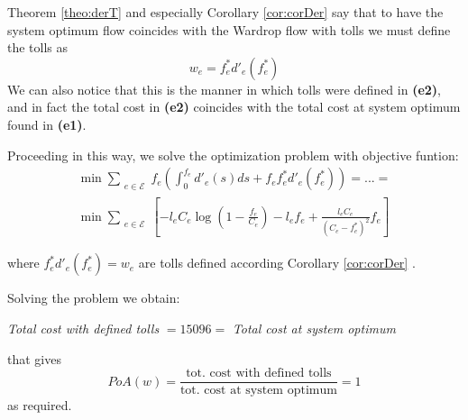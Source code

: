 \documentclass[
	12pt, %
]{fphw}
\begin{document}
\begin{enumerate}[{\bfseries (a)}]
    
    Theorem \ref{theo:derT} and especially Corollary \ref{cor:corDer} say that to have the system optimum flow coincides with the Wardrop flow with tolls we must define the tolls as
    $$w_e = f^*_ed'_e(f^*_e )$$
    We can also notice that this is the manner in which tolls were defined in \textbf{(e2)}, and in fact the total cost in \textbf{(e2)} coincides with the total cost at system optimum found in \textbf{(e1)}.
    
    Proceeding in this way, we solve the optimization problem with objective funtion:
    \begin{multline*}
        \min \sum_{\substack{e \in \mathcal{E}}}f_e\left(\int_0^{f_e}d'_e(s)ds + f_ef^*_ed'_e(f^*_e)\right) = ... = \\\min \sum_{\substack{e \in \mathcal{E}}}\left[-l_eC_e\log\left(1-\frac{f_e}{C_e}\right)-l_ef_e
        +\frac{l_eC_e}{(C_e-f_e^*)^2}f_e\right]
    \end{multline*}
    
    where $f^*_ed'_e(f^*_e) = w_e$ are tolls defined according Corollary \ref{cor:corDer} .
    
    Solving the problem we obtain: 
    \begin{center}
        \emph{Total cost with defined tolls} $= 15096 = $ \emph{Total cost at system optimum}
    \end{center}
    that gives 
    $$
        PoA(w) = \frac{\text{tot. cost with defined tolls}}{\text{tot. cost at system optimum}} = 1
    $$
    as required.
\end{enumerate}

\end{document}
